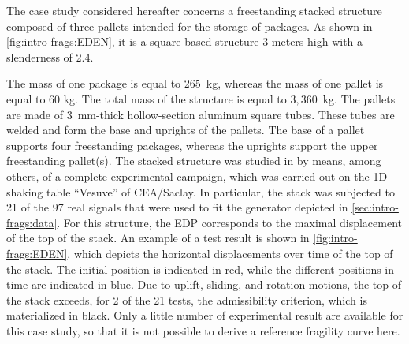     The case study considered hereafter concerns a freestanding stacked structure composed of three pallets intended for the storage of packages. As shown in \cref{fig:intro-frags:EDEN}, it is a square-based structure 3 meters high with a slenderness of 2.4.
    
    
    
    The mass of one package is equal to 265~kg, whereas the mass of one pallet is equal to 60 kg. The total mass of the structure is equal to $3,360$~kg. The pallets are made of 3~mm-thick hollow-section aluminum square tubes. These tubes are welded and form the base and uprights of the pallets. The base of a pallet supports four freestanding packages, whereas the uprights support the upper freestanding pallet(s). The stacked structure was studied in \cite{beylat_contribution_2020} by means, among others, of a complete experimental campaign, which was carried out on the 1D shaking table ``Vesuve'' of CEA/Saclay. In particular, the stack was subjected to 21 of the 97 real signals that were used to fit the generator depicted in \cref{sec:intro-frags:data}.
    For this structure, the EDP corresponds to the maximal displacement of the top of the stack.
    An example of a test result is shown in \cref{fig:intro-frags:EDEN}, which depicts the horizontal displacements over time of the top of the stack. The initial position is indicated in red, while the different positions in time are indicated in blue. {Due to uplift, sliding, and rotation motions, the top of the stack exceeds, for 2 of the 21 tests, the admissibility criterion, which is materialized in black. }
    Only a little number of experimental result are available for this case study, so that it is not possible to derive a reference fragility curve here.






